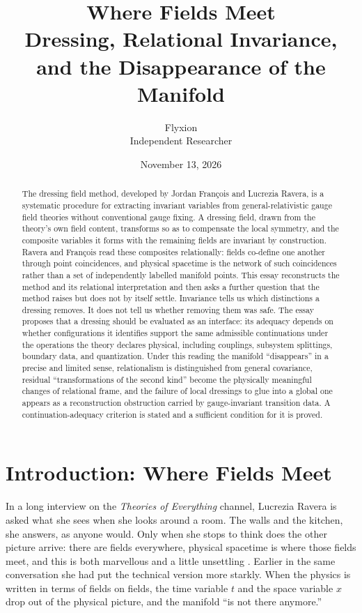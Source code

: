 \documentclass[11pt]{article}
\title{\textbf{Where Fields Meet}\\[4pt]
\large Dressing, Relational Invariance, and the Disappearance of the Manifold}
\author{Flyxion\\ \small Independent Researcher}
\date{November 13, 2026}
\theoremstyle{plain}
\theoremstyle{definition}
\theoremstyle{remark}
\begin{document}
\maketitle

\begin{abstract}
\noindent
The dressing field method, developed by Jordan François and Lucrezia Ravera, is a systematic procedure for extracting invariant variables from general-relativistic gauge field theories without conventional gauge fixing. A dressing field, drawn from the theory's own field content, transforms so as to compensate the local symmetry, and the composite variables it forms with the remaining fields are invariant by construction. Ravera and François read these composites relationally: fields co-define one another through point coincidences, and physical spacetime is the network of such coincidences rather than a set of independently labelled manifold points. This essay reconstructs the method and its relational interpretation and then asks a further question that the method raises but does not by itself settle. Invariance tells us which distinctions a dressing removes. It does not tell us whether removing them was safe. The essay proposes that a dressing should be evaluated as an interface: its adequacy depends on whether configurations it identifies support the same admissible continuations under the operations the theory declares physical, including couplings, subsystem splittings, boundary data, and quantization. Under this reading the manifold ``disappears'' in a precise and limited sense, relationalism is distinguished from general covariance, residual ``transformations of the second kind'' become the physically meaningful changes of relational frame, and the failure of local dressings to glue into a global one appears as a reconstruction obstruction carried by gauge-invariant transition data. A continuation-adequacy criterion is stated and a sufficient condition for it is proved.
\end{abstract}

\tableofcontents
\bigskip

\section{Introduction: Where Fields Meet}

In a long interview on the \emph{Theories of Everything} channel, Lucrezia Ravera is asked what she sees when she looks around a room. The walls and the kitchen, she answers, as anyone would. Only when she stops to think does the other picture arrive: there are fields everywhere, physical spacetime is where those fields meet, and this is both marvellous and a little unsettling \cite{toe}. Earlier in the same conversation she had put the technical version more starkly. When the physics is written in terms of fields on fields, the time variable $t$ and the space variable $x$ drop out of the physical picture, and the manifold ``is not there anymore.''
\end{document}
